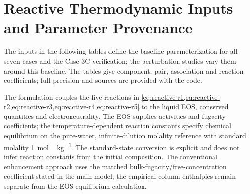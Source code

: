 \section{Reactive Thermodynamic Inputs and Parameter Provenance}\label{sec:selected-reactive-inputs}
The inputs in the following tables define the baseline parameterization for all seven cases and the Case 3C verification; the perturbation studies vary them around this baseline.
The tables give component, pair, association and reaction coefficients; full precision and sources are provided with the code.



The formulation couples the five reactions in \cref{eq:reactive-r1,eq:reactive-r2,eq:reactive-r3,eq:reactive-r4,eq:reactive-r5} to the liquid EOS, conserved quantities and electroneutrality.
The EOS supplies activities and fugacity coefficients; the temperature-dependent reaction constants specify chemical equilibrium on the pure-water, infinite-dilution molality reference with standard molality \qty{1}{mol\,kg^{-1}}.
The standard-state conversion is explicit and does not infer reaction constants from the initial composition.
The conventional enhancement approach uses the matched bulk-fugacity/free-concentration coefficient stated in the main model; the empirical column enthalpies remain separate from the EOS equilibrium calculation.

